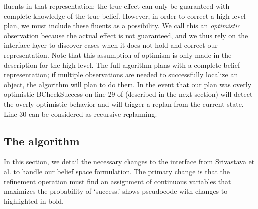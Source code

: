 fluents in that representation: the true effect can only be guaranteed
with complete knowledge of the true belief. However,
in order to correct a high level plan, we must include these fluents as a
possibility. We call this an \emph{optimistic} observation because the actual
effect is not guaranteed, and we thus rely on the interface layer to discover
cases when it does not hold and correct our representation. Note that
this assumption of optimism is only made in the description for the high
level. The full algorithm plans with a complete belief representation; if
multiple observations are needed to successfully localize an object, the algorithm
will plan to do them. In the event that our plan was overly optimistic BCheckSuccess on line 29 of  (described in the next section) will detect the overly optimistic behavior and will trigger a replan from the current state. Line 30 can be considered as recursive replanning.

\subsection{The \ibsp{} algorithm}
\label{sec-ibsp}
In this section, we detail the necessary changes to the interface from
Srivastava et al. to handle our belief space formulation. The primary
change is that the refinement operation must find an assignment of
continuous variables that maximizes the probability of
`success.'  shows pseudocode with changes to  highlighted in bold.

